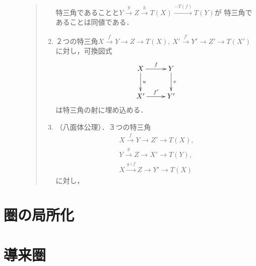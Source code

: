 \begin{Definition}
\begin{description}
\begin{quote}
\begin{enumerate}
                    特三角であることと$Y\overset{g}{\longrightarrow}
                    Z\overset{h}{\longrightarrow} T(X)\overset{-T(f)}{\longrightarrow} T(Y)$が
                    特三角であることは同値である．\label{TR3}
                \item ２つの特三角$X\overset{f}{\to}
                Y\to Z\to T(X)$, $X'\overset{f'}{\to}
                Y'\to Z'\to T(X')$に対し，可換図式
                \begin{equation*}
                    \vcenter{\xymatrix
                    @C=26pt@R=26pt
                    {
                    X\ar[r]^-{f}\ar[d]^-{u}
                    &
                    Y\ar[d]^-{v} 
                    \\
                    X'\ar[r]^-{f'}
                    &
                    Y'
                    }}
                \end{equation*}
                は特三角の射に埋め込める．\label{TR4}
                \item（八面体公理）．３つの特三角
                \begin{align*}
                    X\overset{f}{\to}Y\to Z'\to T(X), \\
                    Y\overset{g}{\to}Z\to X'\to T(Y),\\
                    X\overset{g\circ f}{\longrightarrow}
                    Z\to Y'\to T(X)
                \end{align*}
                に対し， \label{TR5}
            \end{enumerate}    
        \end{quote}
    \end{description}
\end{Definition}

\section{圏の局所化}



\section{導来圏}

